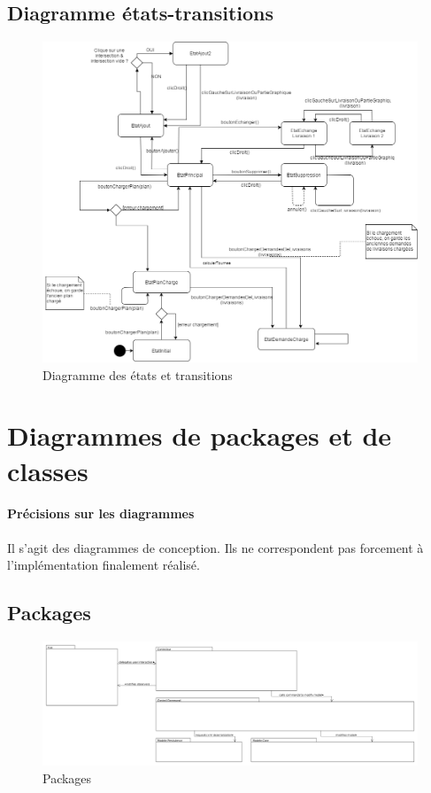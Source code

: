 \documentclass[10pt,a4paper]{book}
\begin{document}
\subsection{Diagramme états-transitions}
\begin{figure}[h!]
    \centering
    \includegraphics[scale=0.35]{diag-et-trans.png}
    \caption{Diagramme des états et transitions}
\end{figure}
\newpage
\section{Diagrammes de packages et de classes}
\paragraph{Précisions sur les diagrammes}
Il s'agit des diagrammes de conception. Ils ne correspondent pas forcement à l'implémentation finalement réalisé.
\subsection{Packages}
\begin{figure}[h!]
    \centering
    \includegraphics[scale=0.2]{packages.png}
    \caption{Packages}
\end{figure}
\newpage
\end{document}
